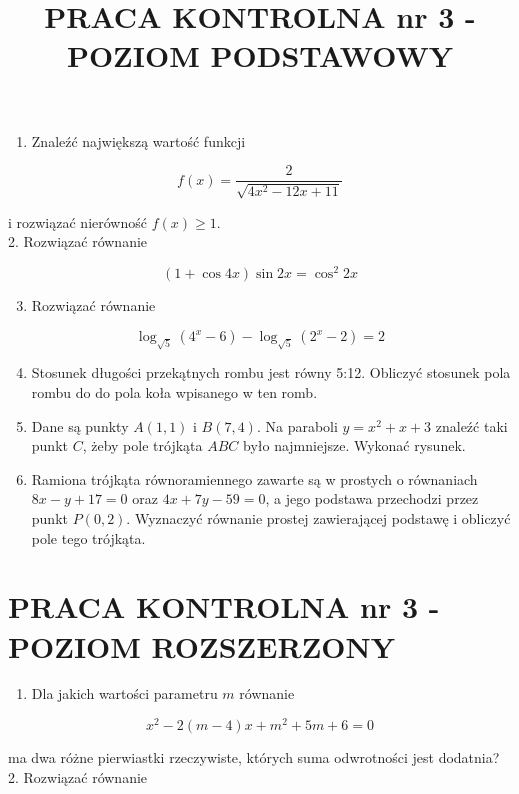 \documentclass[10pt]{article}
\title{PRACA KONTROLNA nr 3 - POZIOM PODSTAWOWY }
\author{}
\date{}
\begin{document}
\maketitle
\begin{enumerate}
  \item Znaleźć największą wartość funkcji
\end{enumerate}

$$
f(x)=\frac{2}{\sqrt{4 x^{2}-12 x+11}}
$$

i rozwiązać nierówność $f(x) \geqslant 1$.\\
2. Rozwiązać równanie

$$
(1+\cos 4 x) \sin 2 x=\cos ^{2} 2 x
$$

\begin{enumerate}
  \setcounter{enumi}{2}
  \item Rozwiązać równanie
\end{enumerate}

$$
\log _{\sqrt{5}}\left(4^{x}-6\right)-\log _{\sqrt{5}}\left(2^{x}-2\right)=2
$$

\begin{enumerate}
  \setcounter{enumi}{3}
  \item Stosunek długości przekątnych rombu jest równy 5:12. Obliczyć stosunek pola rombu do do pola koła wpisanego w ten romb.
  \item Dane są punkty $A(1,1)$ i $B(7,4)$. Na paraboli $y=x^{2}+x+3$ znaleźć taki punkt $C$, żeby pole trójkąta $A B C$ było najmniejsze. Wykonać rysunek.
  \item Ramiona trójkąta równoramiennego zawarte są w prostych o równaniach $8 x-y+17=0$ oraz $4 x+7 y-59=0$, a jego podstawa przechodzi przez punkt $P(0,2)$. Wyznaczyć równanie prostej zawierającej podstawę i obliczyć pole tego trójkąta.
\end{enumerate}

\section*{PRACA KONTROLNA nr 3 - POZIOM ROZSZERZONY}
\begin{enumerate}
  \item Dla jakich wartości parametru $m$ równanie
\end{enumerate}

$$
x^{2}-2(m-4) x+m^{2}+5 m+6=0
$$

ma dwa różne pierwiastki rzeczywiste, których suma odwrotności jest dodatnia?\\
2. Rozwiązać równanie
\end{document}
